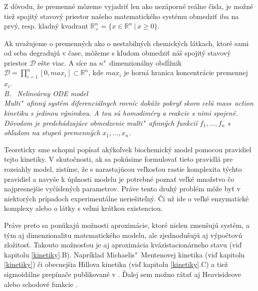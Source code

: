 \documentclass[11pt,final,oneside]{fithesis}
\begin{document}
Z d\^ ovodu, \v ze premenn\'e m\^ ozeme vyjadri\v t len ako nez\'aporn\'e re\'alne \v cisla, je mo\v zn\'e tie\v z spojit\'y stavov\'y priestor na\v seho 
matematick\'eho syst\'emu obmedzi\v t iba na prv\'y, resp. kladn\'y kvadrant {$\mathbb{R}_+^n = \lbrace{}  x \in \mathbb{R}^n\ |\ {}x \geq 0  \rbrace$}.

Ak uva\v zujeme o premenn\'ych ako o nestabiln\'ych chemick\'ych l\'atkach, ktor\'e sami od seba degraduj\'u v \v case, m\^ o\v zeme s k\v ludom obmedzi\v t 
n\'a\v s spojit\'y stavov\'y priestor $\mathcal{D}$ e\v ste viac. A s\'ice na $n$"~dimenzion\'alny obd\'l\v znik $\mathcal{D} = \prod_{i=1}^n[0,max_i] 
\subset \mathbb{R}^n$, kde $max_i$ je horn\'a hranica koncentr\'acie pre\-men\-nej $x_i$.
\cite{HIBI-2009}\cite{HIBI-2010}
\\

\noindent
\it B. \ Neline\'arny ODE model\rm%
\\

Multi"~afinn\'y syst\'em diferenci\'alnych rovn\'ic dok\'a\v ze pokry\v t skoro cel\'u mass~action kinetiku s jedinou v\'ynimkou. A tou s\'u 
homodim\'ery a reakcie s nimi spojen\'e. D\^ ovodom je predch\'adzaj\'uce obmedzenie multi"~afinn\'ych funkci\'i $f_1,\dots{},f_n$ s oh\v ladom 
na stupe\v n premenn\'ych $x_1,\dots{},x_n$.

Teoreticky sme schopn\'i  pop\'isa\v t ak\' yko\v lvek biochemick\'y model pomocou pravidiel tejto kinetiky. V skuto\v cnosti, ak sa pok\'usime formulova\v t 
tieto pravidl\'a pre rozsiahly model, zist\'ime, \v ze s narastaj\'ucou ve\v lkos\v tou rastie komplexita t\'ychto pravidiel a navy\v se k \'uplnosti modelu
je potrebn\'e pozna\v t ve\v lk\'e mno\v zstvo \v co najpresnej\v sie vy\v c\'islen\'ych parametrov. Pr\'ave tento druh\'y probl\'em m\^ o\v ze by\v t 
v niektor\'ych pr\'ipadoch experiment\'alne nerie\v site\v ln\'y. \v Ci u\v z ide o ve\v lk\'e enzymatick\'e komplexy alebo o l\'atky s ve\v lmi 
kr\'atkou existenciou.%

Pr\'ave preto sa pon\'ukaj\'u mo\v znosti aproxim\'acie, ktor\'e nielen zmen\v suj\'u syst\'em, a t\'ym aj dimenzionalitu matematick\'eho modelu, 
ale zjednodu\v suj\'u aj v\'ypo\v ctov\'u zlo\v zitos\v t. Takouto mo\v znos\v tou je aj aproxim\'acia kv\'azistacion\'arneho stavu (vi\v d kapitolu \ref{kinetiky}.B). 
Napr\'iklad Michaelis"~Mentenovej kinetika (vi\v d kapitolu \ref{kinetiky}) 
\v ci obecnej\v sia Hillova kinetika (vi\v d kapitolu \ref{kinetiky}.C) a tie\v z sigmoid\'alne prep\'ina\v ce publikovan\'e v \cite{CAV-2011}. 
\v Dalej sem mo\v zno r\'ata\v t aj Heavisideove alebo schodov\'e funkcie \cite{step}. 
\end{document}
